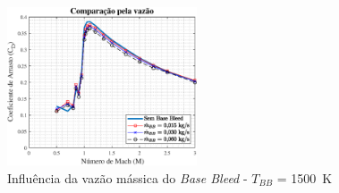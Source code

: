 \begin{figure}[!ht]
	\centering
	\includegraphics[width=0.5\textwidth]{cd-combasebleed-1500K-2pol.eps}
	\caption{Influência da vazão mássica do \textit{Base Bleed} - \(T_{BB}\) = \qty{1500}{\kelvin}}
	\label{fig:comparacao-basebleed-vazao}
\end{figure}


